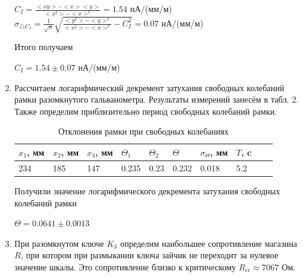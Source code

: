 \documentclass[a4paper]{article}
\begin{document}
\begin{enumerate}
          \begin{center}
              $C_I = \frac{<xy>-<x><y>}{<x^2>-<x>^2} = 1.54$ нА/(мм/м)\\

              $\sigma_{\triangle C_I} = \frac{1}{\sqrt{n}} \sqrt{\frac{<y^2>-<y>^2}{<x^2>-<x>^2} - C_I^2} = 0.07$ нА/(мм/м)
          \end{center}

          Итого получаем
          \begin{center}
              $C_I = 1.54 \pm 0.07$ нА/(мм/м)
          \end{center}

    \item Рассчитаем логарифмический декремент затухания свободных колебаний рамки разомкнутого гальванометра. Результаты измерений занесём в табл. 2. Также определим приблизительно период свободных колебаний рамки.

          \begin{table}[H]
              \centering
              \begin{center}
                  \caption{Отклонения рамки при свободных колебаниях}
              \end{center}
              \vspace{0.1cm}
              \label{tab:my_label}
              \begin{tabular}{ |p{1.2cm}|p{1.2cm}|p{1.2cm}|p{1.2cm}|p{1.2cm}|p{1.2cm}|p{1.2cm}|p{1.2cm}|p{1.2cm}|p{1.2cm}|}
                  \hline
                  $x_1$, мм & $x_2$, мм & $x_3$, мм & $\Theta_1$ & $\Theta_2$ & $\Theta$ & $\sigma_\Theta$, мм & $T$, c \\
                  \hline
                  234       & 185 & 147   & 0.235     & 0.23       & 0.232      & 0.018    & 5.2                          \\
                  \hline
              \end{tabular}
          \end{table}

          Получили значение логарифмического декремента затухания свободных колебаний рамки
          \begin{center}
              $\Theta = 0.0641 \pm 0.0013$
          \end{center}

    \item При разомкнутом ключе $K_3$ определим наибольшее сопротивление магазина $R$, при котором при размыкании ключа зайчик не переходит за нулевое значение шкалы. Это сопротивление близко к критическому $R_\text{cr} \approx 7067$ Ом.


\end{enumerate}
\end{document}

